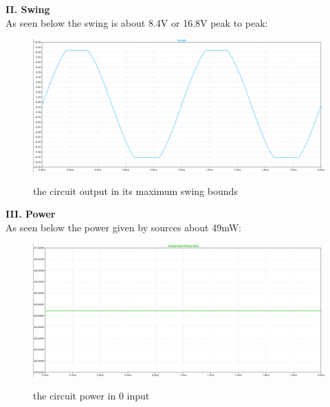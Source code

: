 \documentclass[11pt]{article}
\begin{document}
\textbf{II. Swing}\\
As seen below the swing is about 8.4V or 16.8V peak to peak: \\
\begin{figure}[H]
    \begin{center}
        \includegraphics[scale=0.45]{Fig/swing.png}
        \label{fig:swing}
        \caption{the circuit output in its maximum swing bounds}
    \end{center}
\end{figure}

\textbf{III. Power}\\
As seen below the power given by sources about 49mW: \\
\begin{figure}[H]
    \begin{center}
        \includegraphics[scale=0.45]{Fig/power.png}
        \label{fig:power}
        \caption{the circuit power in 0 input}
    \end{center}
\end{figure}
\end{document}
